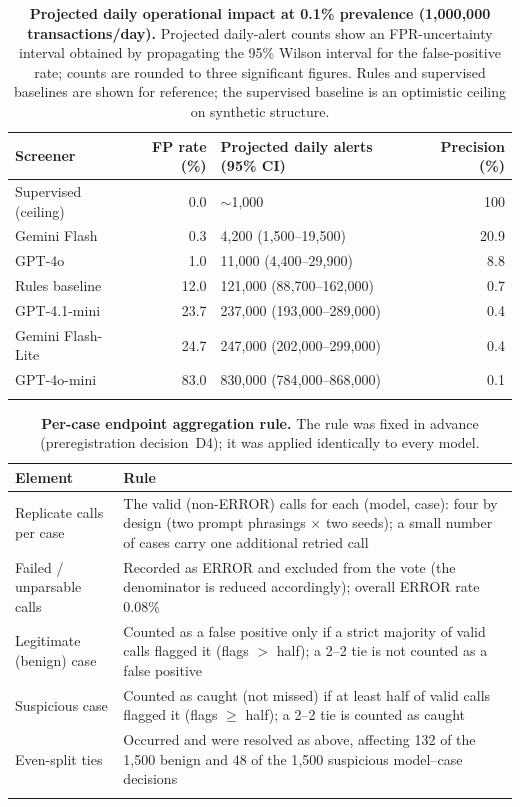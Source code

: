 \documentclass[pdflatex,sn-basic,Numbered]{sn-jnl}
\begin{document}
\begin{table}[t]
\caption{\textbf{Projected daily operational impact at 0.1\% prevalence (1,000,000 transactions/day).} Projected daily-alert counts show an FPR-uncertainty interval obtained by propagating the 95\% Wilson interval for the false-positive rate; counts are rounded to three significant figures. Rules and supervised baselines are shown for reference; the supervised baseline is an optimistic ceiling on synthetic structure.}\label{tab:vol}
\begin{tabular}{@{}lrlr@{}}
\toprule
Screener & FP rate (\%) & Projected daily alerts (95\% CI) & Precision (\%) \\
\midrule
Supervised (ceiling) & 0.0  & $\sim$1{,}000                    & 100 \\
Gemini Flash         & 0.3  & 4{,}200 (1{,}500--19{,}500)      & 20.9 \\
GPT-4o               & 1.0  & 11{,}000 (4{,}400--29{,}900)     & 8.8 \\
Rules baseline       & 12.0 & 121{,}000 (88{,}700--162{,}000)  & 0.7 \\
GPT-4.1-mini         & 23.7 & 237{,}000 (193{,}000--289{,}000) & 0.4 \\
Gemini Flash-Lite    & 24.7 & 247{,}000 (202{,}000--299{,}000) & 0.4 \\
GPT-4o-mini          & 83.0 & 830{,}000 (784{,}000--868{,}000) & 0.1 \\
\botrule
\end{tabular}
\end{table}

\begin{table}[t]
\caption{\textbf{Per-case endpoint aggregation rule.} The rule was fixed in advance (preregistration decision~D4); it was applied identically to every model.}\label{tab:vote}
\begin{tabular}{@{}p{}p{}@{}}
\toprule
Element & Rule \\
\midrule
Replicate calls per case & The valid (non-ERROR) calls for each (model, case): four by design (two prompt phrasings $\times$ two seeds); a small number of cases carry one additional retried call \\
Failed / unparsable calls & Recorded as ERROR and excluded from the vote (the denominator is reduced accordingly); overall ERROR rate 0.08\% \\
Legitimate (benign) case & Counted as a false positive only if a strict majority of valid calls flagged it (flags $>$ half); a 2--2 tie is not counted as a false positive \\
Suspicious case & Counted as caught (not missed) if at least half of valid calls flagged it (flags $\geq$ half); a 2--2 tie is counted as caught \\
Even-split ties & Occurred and were resolved as above, affecting 132 of the 1{,}500 benign and 48 of the 1{,}500 suspicious model--case decisions \\
\botrule
\end{tabular}
\end{table}
\end{document}
